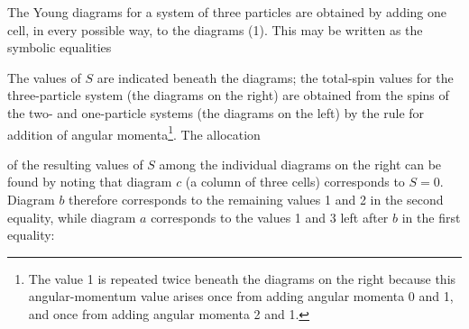 The Young diagrams for a system of three particles are obtained by adding one cell, in every possible way, to the diagrams (1). This may be written as the symbolic equalities
\begin{center}
\end{center}
The values of $S$ are indicated beneath the diagrams; the total-spin values for the three-particle system (the diagrams on the right) are obtained from the spins of the two- and one-particle systems (the diagrams on the left) by the rule for addition of angular momenta\footnote{The value 1 is repeated twice beneath the diagrams on the right because this angular-momentum value arises once from adding angular momenta 0 and 1, and once from adding angular momenta 2 and 1.}. The allocation

of the resulting values of $S$ among the individual diagrams on the right can be found by noting that diagram $c$ (a column of three cells) corresponds to $S=0$. Diagram $b$ therefore corresponds to the remaining values 1 and 2 in the second equality, while diagram $a$ corresponds to the values 1 and 3 left after $b$ in the first equality:
\begin{center}
\end{center}

